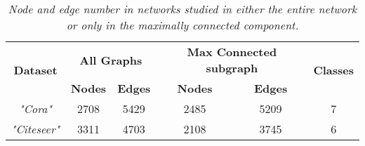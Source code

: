 \begin{table}[ht!]
    \centering
    \begin{tabular}{|c|c|c|c|c|c|}
        \hline
        \multirow{2}{*}{\textbf{Dataset}} & \multicolumn{2}{c|}{\textbf{All Graphs}} & \multicolumn{2}{c|}{\textbf{Max Connected subgraph}} & \multirow{2}{*}{\textbf{Classes}} \\ \cline{2-5}
                                        & \textbf{Nodes}      & \textbf{Edges}     & \textbf{Nodes}            & \textbf{Edges}           &                                   \\ \hline
        \textit{"Cora"}                   & 2708                & 5429               & 2485                      & 5209                     & 7                                 \\ \hline
        \textit{"Citeseer"}               & 3311                & 4703               & 2108                      & 3745                     & 6                                 \\ \hline
    \end{tabular}
    \caption{\textit{Node and edge number in networks studied in either the entire network or only in the maximally connected component.}}
    \label{tab:dataset}
\end{table}
